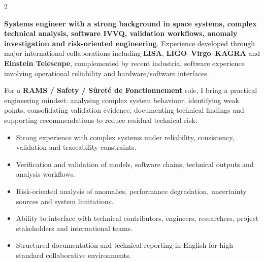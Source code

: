 \documentclass[8pt,a4paper,ragged2e,withhyper]{altacv}
\begin{document}
\begin{paracol}{2}
\switchcolumn


\textbf{Systems engineer with a strong background in space systems, complex technical analysis, software IVVQ, validation workflows, anomaly investigation and risk-oriented engineering}. Experience developed through major international collaborations including \textbf{LISA}, \textbf{LIGO--Virgo--KAGRA} and \textbf{Einstein Telescope}, complemented by recent industrial software experience involving operational reliability and hardware/software interfaces.

For a \textbf{RAMS / Safety / Sûreté de Fonctionnement} role, I bring a practical engineering mindset: analysing complex system behaviour, identifying weak points, consolidating validation evidence, documenting technical findings and supporting recommendations to reduce residual technical risk.

\begin{itemize}
  \item Strong experience with complex systems under reliability, consistency, validation and traceability constraints.
  \item Verification and validation of models, software chains, technical outputs and analysis workflows.
  \item Risk-oriented analysis of anomalies, performance degradation, uncertainty sources and system limitations.
  \item Ability to interface with technical contributors, engineers, researchers, project stakeholders and international teams.
  \item Structured documentation and technical reporting in English for high-standard collaborative environments.
\end{itemize}


\divider
{}
\divider

\medskip



\divider


\divider


\divider




\end{paracol}
\end{document}
